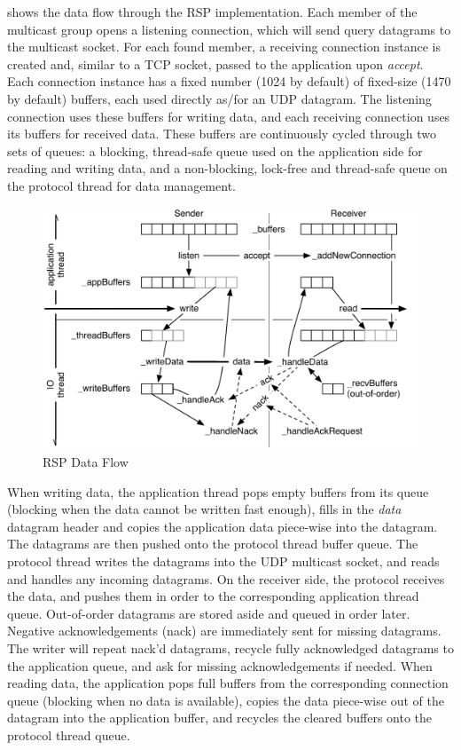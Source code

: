  shows the data flow through the RSP implementation. Each member of
the multicast group opens a listening connection, which will send query
datagrams to the multicast socket. For each found member, a receiving
connection instance is created and, similar to a TCP socket, passed to the
application upon {\em accept}. Each connection instance has a fixed number
(1024 by default) of fixed-size (1470 by default) buffers, each used directly
as/for an UDP datagram. The listening connection uses these buffers for writing
data, and each receiving connection uses its buffers for received data. These
buffers are continuously cycled through two sets of queues: a blocking,
thread-safe queue used on the application side for reading and writing data,
and a non-blocking, lock-free and thread-safe queue on the protocol thread for
data management.

\begin{figure}[h!t]\center
  \includegraphics[width=\textwidth]{images/rspPackets.pdf}
  {\caption{\label{fRSP}RSP Data Flow}}
\end{figure}

When writing data, the application thread pops empty buffers from its queue
(blocking when the data cannot be written fast enough), fills in the
{\em data} datagram header and copies the application data piece-wise into
the datagram. The datagrams are then pushed onto the protocol thread buffer
queue. The protocol thread writes the datagrams into the UDP multicast socket,
and reads and handles any incoming datagrams. On the receiver side, the protocol
receives the data, and pushes them in order to the corresponding application
thread queue. Out-of-order datagrams are stored aside and queued in order later.
Negative acknowledgements (nack) are immediately sent for missing
datagrams. The writer will repeat nack'd datagrams, recycle fully acknowledged
datagrams to the application queue, and ask for missing acknowledgements if
needed. When reading data, the application pops full buffers from the
corresponding connection queue (blocking when no data is available), copies
the data piece-wise out of the datagram into the application buffer, and recycles
the cleared buffers onto the protocol thread queue.

